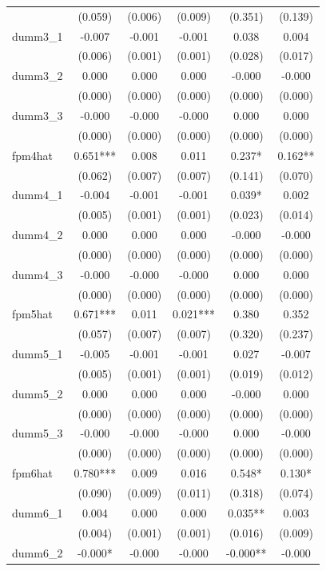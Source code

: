 \documentclass[]{article}
\begin{document}
\begin{tabular}{lccccc}
 & (0.059) & (0.006) & (0.009) & (0.351) & (0.139) \\
dumm3\_1 & -0.007 & -0.001 & -0.001 & 0.038 & 0.004 \\
 & (0.006) & (0.001) & (0.001) & (0.028) & (0.017) \\
dumm3\_2 & 0.000 & 0.000 & 0.000 & -0.000 & -0.000 \\
 & (0.000) & (0.000) & (0.000) & (0.000) & (0.000) \\
dumm3\_3 & -0.000 & -0.000 & -0.000 & 0.000 & 0.000 \\
 & (0.000) & (0.000) & (0.000) & (0.000) & (0.000) \\
fpm4hat & 0.651*** & 0.008 & 0.011 & 0.237* & 0.162** \\
 & (0.062) & (0.007) & (0.007) & (0.141) & (0.070) \\
dumm4\_1 & -0.004 & -0.001 & -0.001 & 0.039* & 0.002 \\
 & (0.005) & (0.001) & (0.001) & (0.023) & (0.014) \\
dumm4\_2 & 0.000 & 0.000 & 0.000 & -0.000 & -0.000 \\
 & (0.000) & (0.000) & (0.000) & (0.000) & (0.000) \\
dumm4\_3 & -0.000 & -0.000 & -0.000 & 0.000 & 0.000 \\
 & (0.000) & (0.000) & (0.000) & (0.000) & (0.000) \\
fpm5hat & 0.671*** & 0.011 & 0.021*** & 0.380 & 0.352 \\
 & (0.057) & (0.007) & (0.007) & (0.320) & (0.237) \\
dumm5\_1 & -0.005 & -0.001 & -0.001 & 0.027 & -0.007 \\
 & (0.005) & (0.001) & (0.001) & (0.019) & (0.012) \\
dumm5\_2 & 0.000 & 0.000 & 0.000 & -0.000 & 0.000 \\
 & (0.000) & (0.000) & (0.000) & (0.000) & (0.000) \\
dumm5\_3 & -0.000 & -0.000 & -0.000 & 0.000 & -0.000 \\
 & (0.000) & (0.000) & (0.000) & (0.000) & (0.000) \\
fpm6hat & 0.780*** & 0.009 & 0.016 & 0.548* & 0.130* \\
 & (0.090) & (0.009) & (0.011) & (0.318) & (0.074) \\
dumm6\_1 & 0.004 & 0.000 & 0.000 & 0.035** & 0.003 \\
 & (0.004) & (0.001) & (0.001) & (0.016) & (0.009) \\
dumm6\_2 & -0.000* & -0.000 & -0.000 & -0.000** & -0.000 \\

\end{tabular}
\end{document}
